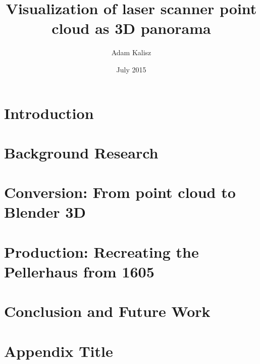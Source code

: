 \documentclass[12pt, twoside, titlepage]{book}
\title{Visualization of laser scanner point cloud as 3D panorama}
\author{Adam Kalisz}
\date{July 2015}
\begin{document}
	
	
	
	\thispagestyle{empty}
	
	
	
	

	\tableofcontents
	
	\listoffigures
	\listoftables
	
	\chapter{Introduction}
	
	\chapter{Background Research}
	
	\chapter{Conversion: From point cloud to Blender 3D}
	
	\chapter{Production: Recreating the Pellerhaus from 1605}
	
	\chapter{Conclusion and Future Work}
		
	
	
	\appendix
	\chapter{Appendix Title}
	
	
	\printbibliography
		
\end{document}
